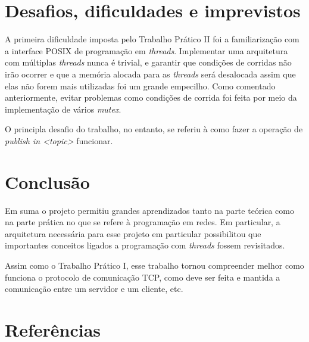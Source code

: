 \documentclass{article}
\begin{document}
\section{Desafios, dificuldades e imprevistos}

A primeira dificuldade imposta pelo Trabalho Prático II foi a familiarização
com a
interface POSIX de programação em \textit{threads}. Implementar uma arquitetura
com múltiplas \textit{threads}
nunca é trivial, e garantir que condições de corridas não irão ocorrer e que a
memória alocada para as \textit{threads} será desalocada assim que elas não
forem mais utilizadas foi um grande empecilho. Como comentado anteriormente,
evitar problemas como condições de corrida foi feita por meio da implementação
de vários \textit{mutex}.

O principla desafio do trabalho, no entanto, se referiu à como fazer a operação
de \textit{publish in <topic>} funcionar.

\section{Conclusão}

Em suma o projeto permitiu grandes aprendizados tanto na parte teórica como na
parte prática no que se refere à programação em redes. Em particular, a
arquitetura necessária para esse projeto em particular possibilitou que
importantes conceitos ligados a programação com \textit{threads} fossem
revisitados.

Assim como o Trabalho Prático I, esse trabalho tornou compreender melhor como
funciona o protocolo de comunicação TCP, como
deve ser feita e mantida a comunicação entre um servidor e um cliente, etc.

\section{Referências}
\end{document}
